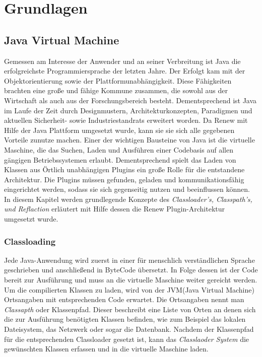 \chapter{Grundlagen} 
\label{cha:Grundlagen}


\section{Java Virtual Machine} 
\label{sec:Java Virtual Machine}
Gemessen am Interesse der Anwender und an seiner Verbreitung ist Java die erfolgreichste Programmiersprache der letzten Jahre. Der Erfolgt kam mit der Objektorientierung sowie der Plattformunabhängigkeit. Diese Fähigkeiten brachten eine große und fähige Kommune zusammen, die sowohl aus der Wirtschaft als auch aus der Forschungsbereich besteht. Dementsprechend ist Java im Laufe der Zeit durch Designmustern, Architekturkonzepten, Paradigmen und aktuellen Sicherheit- sowie Industriestandrats erweitert worden. Da Renew mit Hilfe der Java Plattform umgesetzt wurde, kann sie sie sich alle gegebenen Vorteile zunutze machen. 
Einer der wichtigen Bausteine von Java ist die virtuelle Maschine, die das Suchen, Laden und Ausführen einer Codebasis auf allen gängigen Betriebssystemen erlaubt. Dementsprechend spielt das Laden von Klassen aus Örtlich unabhängigen Plugins ein große Rolle für die entstandene Architektur. Die Plugins müssen gefunden, geladen und kommunikationsfähig eingerichtet werden, sodass sie sich gegenseitig nutzen und beeinflussen können. \newline 
In diesem Kapitel werden grundlegende Konzepte des \textit{Classloader's, Classpath's, und Reflaction} erläutert mit Hilfe dessen die Renew Plugin-Architektur umgesetzt wurde.

\subsection{Classloading}
\label{sub:Classloading}

Jede Java-Anwendung wird zuerst in einer für menschlich verständlichen Sprache geschrieben und anschließend in ByteCode übersetzt. In Folge dessen ist der Code bereit zur Ausführung und muss an die virtuelle Maschine weiter gereicht werden.\newline
Um die compilierten Klassen zu laden, wird von der JVM(Java Virtual Machine) Ortsangaben mit entsprechenden Code erwartet. Die Ortsangaben nennt man \textit{Classapth} oder Klassenpfad. Dieser beschreibt eine Liste von Orten an denen sich die zur Ausführung benötigten Klassen befinden, wie zum Beispiel das lokalen Dateisystem, das Netzwerk oder sogar die Datenbank. Nachdem der Klassenpfad für die entsprechenden Classloader gesetzt ist, kann das \textit{Classlaoder System} die gewünschten Klassen erfassen und in die virtuelle Maschine laden.

